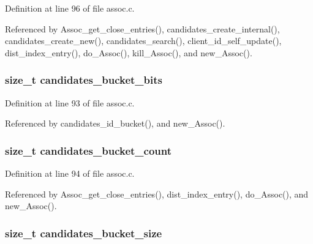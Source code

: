 Definition at line 96 of file assoc.\+c.



Referenced by Assoc\+\_\+get\+\_\+close\+\_\+entries(), candidates\+\_\+create\+\_\+internal(), candidates\+\_\+create\+\_\+new(), candidates\+\_\+search(), client\+\_\+id\+\_\+self\+\_\+update(), dist\+\_\+index\+\_\+entry(), do\+\_\+\+Assoc(), kill\+\_\+\+Assoc(), and new\+\_\+\+Assoc().

\hypertarget{struct_assoc_ab4153986e9b7dd71547967436299a424}{
\subsubsection[{candidates\+\_\+bucket\+\_\+bits}]{\setlength{\rightskip}{0pt plus 5cm}size\+\_\+t candidates\+\_\+bucket\+\_\+bits}}\label{struct_assoc_ab4153986e9b7dd71547967436299a424}


Definition at line 93 of file assoc.\+c.



Referenced by candidates\+\_\+id\+\_\+bucket(), and new\+\_\+\+Assoc().

\hypertarget{struct_assoc_a22dd0674eae131fab27462b931d4397c}{
\subsubsection[{candidates\+\_\+bucket\+\_\+count}]{\setlength{\rightskip}{0pt plus 5cm}size\+\_\+t candidates\+\_\+bucket\+\_\+count}}\label{struct_assoc_a22dd0674eae131fab27462b931d4397c}


Definition at line 94 of file assoc.\+c.



Referenced by Assoc\+\_\+get\+\_\+close\+\_\+entries(), dist\+\_\+index\+\_\+entry(), do\+\_\+\+Assoc(), and new\+\_\+\+Assoc().

\hypertarget{struct_assoc_a9349f5b3095733f74b3704aa9766a05a}{
\subsubsection[{candidates\+\_\+bucket\+\_\+size}]{\setlength{\rightskip}{0pt plus 5cm}size\+\_\+t candidates\+\_\+bucket\+\_\+size}}\label{struct_assoc_a9349f5b3095733f74b3704aa9766a05a}



